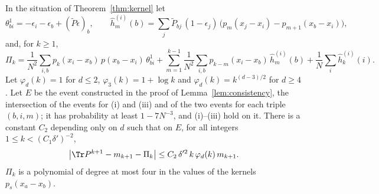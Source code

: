 \begin{proposition}\label{prop:reduction}
In the situation of Theorem~\ref{thm:kernel} let
\[
\theta^1_{bi}=-\epsilon_i-\epsilon_b+(\tilde P\epsilon)_b,\qquad
\hat h^{(i)}_m(b)=\sum_j\tilde P_{bj}\,(1-\epsilon_j)\,\big(p_m(x_j-x_i)-p_{m+1}(x_b-x_i)\big),
\]
and, for $k\ge1$,
\[
\Pi_k=\frac1{N^2}\sum_{i,b}p_k(x_i-x_b)\,p(x_b-x_i)\,\theta^1_{bi}
+\sum_{m=1}^{k-1}\frac1{N^2}\sum_{i,b}p_{k-m}(x_i-x_b)\,\hat h^{(i)}_m(b)
+\frac1N\sum_i\hat h^{(i)}_k(i).
\]
Let $\varphi_d(k)=1$ for $d\le2$, $\varphi_3(k)=1+\log k$ and $\varphi_d(k)=k^{(d-3)/2}$ for $d\ge4$. Let $E$ be the event constructed in the proof of Lemma~\ref{lem:consistency}, the intersection of the events for (i) and (iii) and of the two events for each triple $(b,i,m)$; it has probability at least $1-7N^{-3}$, and (i)--(iii) hold on it. There is a constant $C_2$ depending only on $d$ such that on $E$, for all integers $1\le k<(C_1\delta')^{-2}$,
\[
\big|\Tr P^{k+1}-m_{k+1}-\Pi_k\big|\le C_2\,\delta'^2\,k\,\varphi_d(k)\,m_{k+1}.
\]
$\Pi_k$ is a polynomial of degree at most four in the values of the kernels $p_s(x_a-x_b)$.
\end{proposition}

